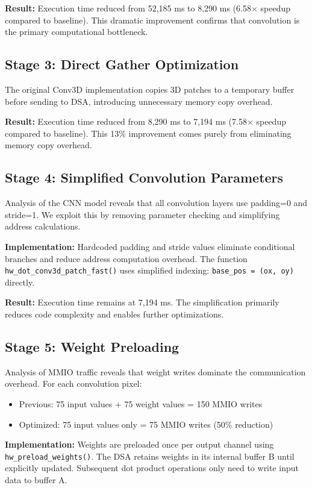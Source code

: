 \documentclass[conference]{IEEEtran}
\begin{document}
\textbf{Result:} Execution time reduced from 52,185 ms to 8,290 ms (6.58$\times$ speedup compared to baseline). This dramatic improvement confirms that convolution is the primary computational bottleneck.

\subsection{Stage 3: Direct Gather Optimization}

The original Conv3D implementation copies 3D patches to a temporary buffer before sending to DSA, introducing unnecessary memory copy overhead.


\textbf{Result:} Execution time reduced from 8,290 ms to 7,194 ms (7.58$\times$ speedup compared to baseline). This 13\% improvement comes purely from eliminating memory copy overhead.

\subsection{Stage 4: Simplified Convolution Parameters }

Analysis of the CNN model reveals that all convolution layers use padding=0 and stride=1. We exploit this by removing parameter checking and simplifying address calculations.

\textbf{Implementation:} Hardcoded padding and stride values eliminate conditional branches and reduce address computation overhead. The function \texttt{hw\_dot\_conv3d\_patch\_fast()} uses simplified indexing: \texttt{base\_pos = (ox, oy)} directly.

\textbf{Result:} Execution time remains at 7,194 ms. The simplification primarily reduces code complexity and enables further optimizations.

\subsection{Stage 5: Weight Preloading }

Analysis of MMIO traffic reveals that weight writes dominate the communication overhead. For each convolution pixel:
\begin{itemize}
    \item Previous: 75 input values + 75 weight values = 150 MMIO writes
    \item Optimized: 75 input values only = 75 MMIO writes (50\% reduction)
\end{itemize}

\textbf{Implementation:} Weights are preloaded once per output channel using \texttt{hw\_preload\_weights()}. The DSA retains weights in its internal buffer B until explicitly updated. Subsequent dot product operations only need to write input data to buffer A.
\end{document}
